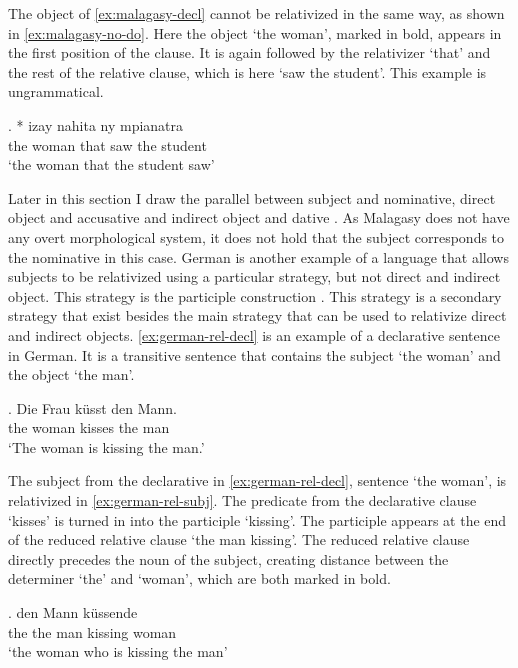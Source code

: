 The object of \ref{ex:malagasy-decl} cannot be relativized in the same way, as shown in \ref{ex:malagasy-no-do}. Here the object  `the woman', marked in bold, appears in the first position of the clause. It is again followed by the relativizer  `that' and the rest of the relative clause, which is here  `saw the student'. This example is ungrammatical.

\exg. *  izay nahita ny mpianatra\\
 the woman that saw the student\\
 `the woman that the student saw' \label{ex:malagasy-no-do}

Later in this section I draw the parallel between subject and nominative, direct object and accusative and indirect object and dative \citep[after][]{caha2009}. As Malagasy does not have any overt morphological system, it does not hold that the subject corresponds to the nominative in this case.
German is another example of a language that allows subjects to be relativized using a particular strategy, but not direct and indirect object. This strategy is the participle construction \citep{keenan1977}. This strategy is a secondary strategy that exist besides the main strategy that can be used to relativize direct and indirect objects. \ref{ex:german-rel-decl} is an example of a declarative sentence in German. It is a transitive sentence that contains the subject  `the woman' and the object  `the man'.

\exg. Die Frau küsst den Mann.\\
the woman kisses the man\\
`The woman is kissing the man.' \label{ex:german-rel-decl}

The subject from the declarative in \ref{ex:german-rel-decl}, sentence  `the woman', is relativized in \ref{ex:german-rel-subj}. The predicate from the declarative clause  `kisses' is turned in into the participle  `kissing'. The participle appears at the end of the reduced relative clause  `the man kissing'. The reduced relative clause directly precedes the noun of the subject, creating distance between the determiner  `the' and  `woman', which are both marked in bold.

\exg.  den Mann küssende \\
 the the man kissing woman\\
 `the woman who is kissing the man' \label{ex:german-rel-subj}

